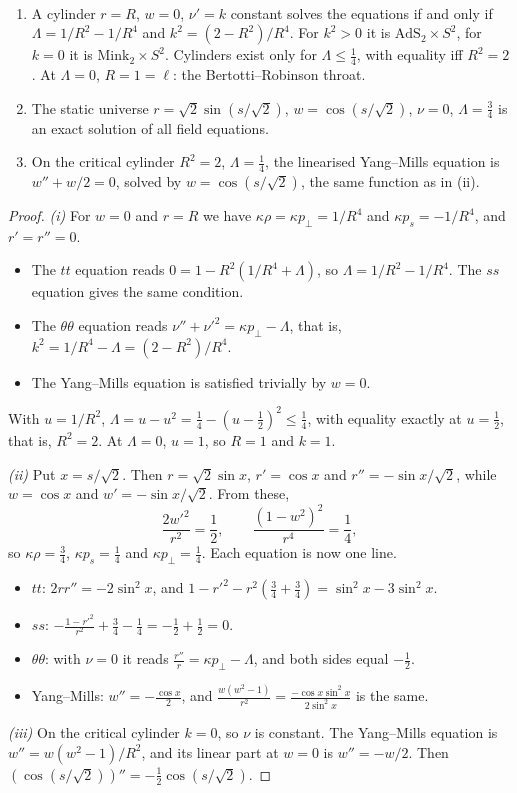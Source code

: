 \begin{theorem}\label{thm:cylinders}\ver\
\begin{enumerate}[label=(\roman*)]
\item A cylinder $r=R$, $w=0$, $\nu'=k$ constant solves the equations if and only if $\Lambda=1/R^2-1/R^4$ and $k^2=(2-R^2)/R^4$. For $k^2>0$ it is $\mathrm{AdS}_2\times S^2$, for $k=0$ it is $\mathrm{Mink}_2\times S^2$. Cylinders exist only for $\Lambda\le\frac14$, with equality iff $R^2=2$. At $\Lambda=0$, $R=1=\ell$: the Bertotti--Robinson throat.
\item The static universe $r=\sqrt2\sin(s/\sqrt2)$, $w=\cos(s/\sqrt2)$, $\nu=0$, $\Lambda=\frac34$ is an exact solution of all field equations.
\item On the critical cylinder $R^2=2$, $\Lambda=\frac14$, the linearised Yang--Mills equation is $w''+w/2=0$, solved by $w=\cos(s/\sqrt2)$, the same function as in (ii).
\end{enumerate}
\end{theorem}
\begin{proof}
\emph{(i)} For $w=0$ and $r=R$ we have $\kappa\rho=\kappa p_\perp=1/R^4$ and $\kappa p_s=-1/R^4$, and $r'=r''=0$.
\begin{itemize}[nosep]
\item The $tt$ equation reads $0=1-R^2(1/R^4+\Lambda)$, so $\Lambda=1/R^2-1/R^4$. The $ss$ equation gives the same condition.
\item The $\theta\theta$ equation reads $\nu''+\nu'^2=\kappa p_\perp-\Lambda$, that is, $k^2=1/R^4-\Lambda=(2-R^2)/R^4$.
\item The Yang--Mills equation is satisfied trivially by $w=0$.
\end{itemize}
With $u=1/R^2$, $\Lambda=u-u^2=\frac14-(u-\frac12)^2\le\frac14$, with equality exactly at $u=\frac12$, that is, $R^2=2$. At $\Lambda=0$, $u=1$, so $R=1$ and $k=1$.

\emph{(ii)} Put $x=s/\sqrt2$. Then $r=\sqrt2\sin x$, $r'=\cos x$ and $r''=-\sin x/\sqrt2$, while $w=\cos x$ and $w'=-\sin x/\sqrt2$. From these,
\[
\frac{2w'^2}{r^2}=\frac12,\qquad\frac{(1-w^2)^2}{r^4}=\frac14,
\]
so $\kappa\rho=\frac34$, $\kappa p_s=\frac14$ and $\kappa p_\perp=\frac14$. Each equation is now one line.
\begin{itemize}[nosep]
\item $tt$: $2rr''=-2\sin^2x$, and $1-r'^2-r^2(\frac34+\frac34)=\sin^2x-3\sin^2x$.
\item $ss$: $-\frac{1-r'^2}{r^2}+\frac34-\frac14=-\frac12+\frac12=0$.
\item $\theta\theta$: with $\nu=0$ it reads $\frac{r''}r=\kappa p_\perp-\Lambda$, and both sides equal $-\frac12$.
\item Yang--Mills: $w''=-\frac{\cos x}2$, and $\frac{w(w^2-1)}{r^2}=\frac{-\cos x\sin^2x}{2\sin^2x}$ is the same.
\end{itemize}

\emph{(iii)} On the critical cylinder $k=0$, so $\nu$ is constant. The Yang--Mills equation is $w''=w(w^2-1)/R^2$, and its linear part at $w=0$ is $w''=-w/2$. Then $(\cos(s/\sqrt2))''=-\frac12\cos(s/\sqrt2)$.
\end{proof}


